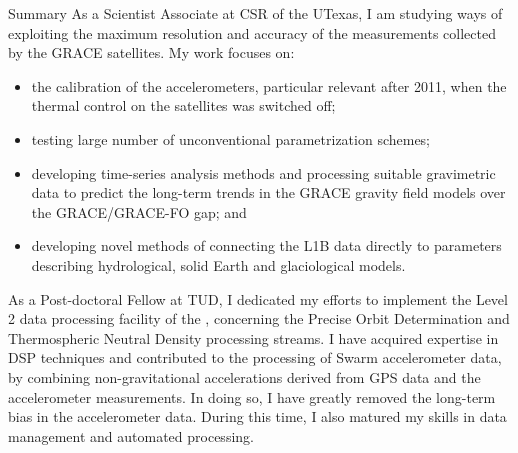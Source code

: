 \begin{cvtext}{Summary}
As a Scientist Associate at \ac{CSR} of the \ac{UTexas}, I am studying ways of exploiting the maximum resolution and accuracy of the measurements collected by the \ac{GRACE} satellites.
My work focuses on:
\begin{itemize}[topsep=0pt,itemsep=1pt,parsep=0pt,partopsep=0pt]
\item the calibration of the accelerometers, particular relevant after 2011, when the thermal control on the satellites was switched off;
\item testing large number of unconventional parametrization schemes;
\item developing time-series analysis methods and processing suitable gravimetric data to predict the long-term trends in the \ac{GRACE} gravity field models over the \ac{GRACE}\slash\ac{GRACE-FO} gap; and
\item developing novel methods of connecting the L1B data directly to parameters describing hydrological, solid Earth and glaciological models.
\end{itemize}

As a Post-doctoral Fellow at \ac{TUD}, I dedicated my efforts to implement the Level 2 data processing facility of the , concerning the Precise Orbit Determination and Thermospheric Neutral Density processing streams.
I have acquired expertise in \ac{DSP} techniques and contributed to the processing of Swarm accelerometer data, by combining non-gravitational accelerations derived from \ac{GPS} data and the accelerometer measurements.
In doing so, I have greatly removed the long-term bias in the accelerometer data.
During this time, I also matured my skills in data management and automated processing.


\end{cvtext}
